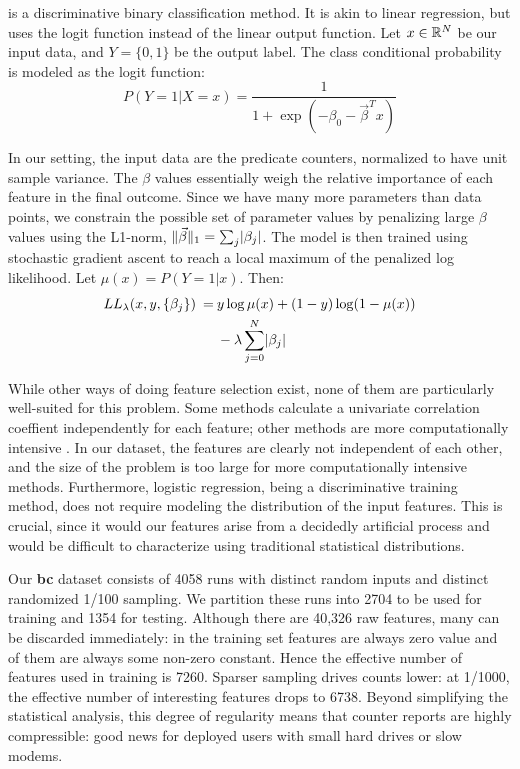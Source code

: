  \cite{Hastie01} is a discriminative
binary classification method.  It is akin to linear regression, but
uses the logit function instead of the linear output function.  Let $x
\in \mathbb{R}^N$ be our input data, and $Y = \{0, 1\}$ be the output
label.  The class conditional probability is modeled as the logit
function:
\begin{equation*}
  P(Y = 1 | X = x) = \frac{1}{ 1 + \exp(- \beta_0 - \vec\beta^T x) }
\end{equation*}

In our setting, the input data are the predicate counters, normalized
to have unit sample variance.  The $\beta$ values essentially weigh
the relative importance of each feature in the final outcome.  Since
we have many more parameters than data points, we constrain the
possible set of parameter values by penalizing large $\beta$ values
using the L1-norm, $\lVert\vec\beta\rVert_1 = \sum_j \lvert\beta_j\rvert$.  The
model is then trained using stochastic gradient ascent to reach a
local maximum of the penalized log likelihood.  Let $\mu(x) = P(Y = 1
| x)$.  Then:
\begin{equation*}
  \begin{split}
    LL_\lambda (x, y, \{\beta_j\}) \:=\:
    & y \log \mu(x) + (1 - y) \log (1 - \mu(x)) \\
    & - \lambda \sum_{j = 0}^N \lvert\beta_j\rvert
  \end{split}
\end{equation*}

While other ways of doing feature selection exist, none of them are
particularly well-suited for this problem.  Some methods
\cite{Golub:MCC:1999,Tibshirani2002} calculate a univariate
correlation coeffient independently for each feature; other methods
are more computationally intensive \cite{Breiman:RFRF:1999,Hastie01}.
In our dataset, the features are clearly not independent of each
other, and the size of the problem is too large for more
computationally intensive methods.  Furthermore, logistic regression,
being a discriminative training method, does not require modeling the
distribution of the input features.  This is crucial, since it would
our features arise from a decidedly artificial process and would be
difficult to characterize using traditional statistical distributions.

Our \textbf{bc} dataset consists of 4058 runs with distinct random
inputs and distinct randomized 1/100 sampling.  We partition these
runs into 2704 to be used for training and 1354 for testing.  Although
there are 40,326 raw features, many can be discarded immediately: in
the training set  features are always zero value and
 of them are always some non-zero constant.  Hence the
effective number of features used in training is 7260.  Sparser
sampling drives counts lower: at 1/1000, the effective number of
interesting features drops to 6738.  Beyond simplifying the
statistical analysis, this degree of regularity means that counter
reports are highly compressible: good news for deployed users with
small hard drives or slow modems.

